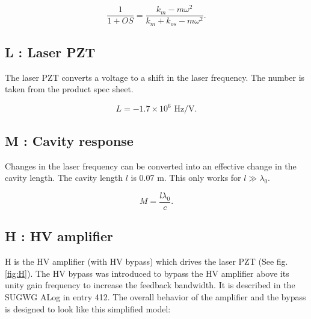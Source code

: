 
\begin{equation}
\frac{1}{1+OS} = \frac{k_m-m\omega^2}{k_m+k_{os}-m\omega^2}.
\label{eq:OS_CL}
\end{equation}

\subsection{L : Laser PZT}

The laser PZT converts a voltage to a shift in the laser frequency. The number is taken from the product spec sheet.

\begin{equation}
L = -1.7\times 10^6 \mbox{ Hz/V}.
\label{eq:L}
\end{equation}

\subsection{M : Cavity response}

Changes in the laser frequency can be converted into an effective change in the cavity length.  The cavity length $l$ is 0.07 m. This only works for $l\gg\lambda_0$.

\begin{equation}
M=\frac{l\lambda_0}{c}.
\label{eq:loopM}
\end{equation}


\subsection{H : HV amplifier}

H is the HV amplifier (with HV bypass) which drives the laser PZT (See fig. \ref{fig:H}). 
The HV bypass was introduced to bypass the HV amplifier above its unity gain frequency to increase the feedback bandwidth.  
It is described in the SUGWG ALog in entry 412.  
The overall behavior of the amplifier and the bypass is designed to look like this simplified model:

